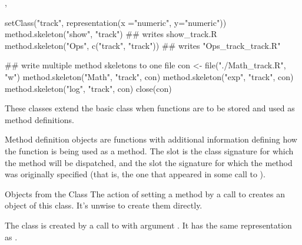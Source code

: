 %
\begin{SeeAlso}\relax
{}, 
\end{SeeAlso}
%
\begin{Examples}
\begin{ExampleCode}

setClass("track", representation(x ="numeric", y="numeric"))
method.skeleton("show", "track")            ## writes show_track.R
method.skeleton("Ops", c("track", "track")) ## writes "Ops_track_track.R"

## write multiple method skeletons to one file
con <- file("./Math_track.R", "w")
method.skeleton("Math", "track", con)
method.skeleton("exp", "track", con)
method.skeleton("log", "track", con)
close(con)

\end{ExampleCode}
\end{Examples}
%
\begin{Description}\relax
These classes extend the basic class  when
functions are to be stored and used as method definitions.
\end{Description}
%
\begin{Details}\relax
Method definition objects are functions with additional information
defining how the function is being used as a method.  The
 slot is the class signature for which the method will
be dispatched, and the  slot the signature for which
the method was originally specified (that is, the one that appeared
in some call to ).
\end{Details}
%
\begin{Section}{Objects from the Class}
The action of setting a method by a call to  creates an object of this class.  It's
unwise to create them directly.

The class  is created by a call to
 with argument .  It has
the same representation as .
\end{Section}
%
